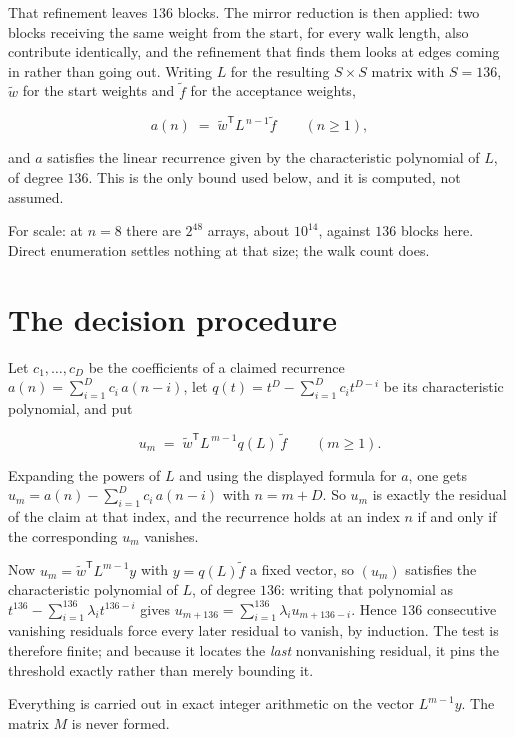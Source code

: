 \documentclass[11pt]{article}
\theoremstyle{definition}
\begin{document}
That refinement leaves $136$ blocks. The mirror reduction is then applied: two blocks receiving the same weight from the start, for every walk length, also contribute identically, and the refinement that finds them looks at edges coming in rather than going out. Writing $L$ for the resulting $S \times S$ matrix with $S = 136$, $\tilde w$ for the start weights and $\tilde f$ for the acceptance weights,

\[a(n) \;=\; \tilde w^{\mathsf T} L^{\,n-1} \tilde f \qquad (n \ge 1),\]

and $a$ satisfies the linear recurrence given by the characteristic polynomial of $L$, of degree $136$. This is the only bound used below, and it is computed, not assumed.

For scale: at $n = 8$ there are $2^{48}$ arrays, about $10^{14}$, against $136$ blocks here. Direct enumeration settles nothing at that size; the walk count does.

\section{The decision procedure}

Let $c_1,\dots,c_D$ be the coefficients of a claimed recurrence $a(n) = \sum_{i=1}^{D} c_i\,a(n-i)$, let $q(t) = t^{D} - \sum_{i=1}^{D} c_i t^{D-i}$ be its characteristic polynomial, and put

\[u_m \;=\; \tilde w^{\mathsf T} L^{\,m-1} q(L)\,\tilde f \qquad (m \ge 1).\]

Expanding the powers of $L$ and using the displayed formula for $a$, one gets $u_m = a(n) - \sum_{i=1}^{D} c_i\,a(n-i)$ with $n = m + D$. So $u_m$ is exactly the residual of the claim at that index, and the recurrence holds at an index $n$ if and only if the corresponding $u_m$ vanishes.

Now $u_m = \tilde w^{\mathsf T} L^{m-1} y$ with $y = q(L)\tilde f$ a fixed vector, so $(u_m)$ satisfies the characteristic polynomial of $L$, of degree $136$: writing that polynomial as $t^{136} - \sum_{i=1}^{136} \lambda_i t^{136-i}$ gives $u_{m+136} = \sum_{i=1}^{136} \lambda_i u_{m+136-i}$. Hence $136$ consecutive vanishing residuals force every later residual to vanish, by induction. The test is therefore finite; and because it locates the {\itshape last} nonvanishing residual, it pins the threshold exactly rather than merely bounding it.

Everything is carried out in exact integer arithmetic on the vector $L^{m-1}y$. The matrix $M$ is never formed.
\end{document}
